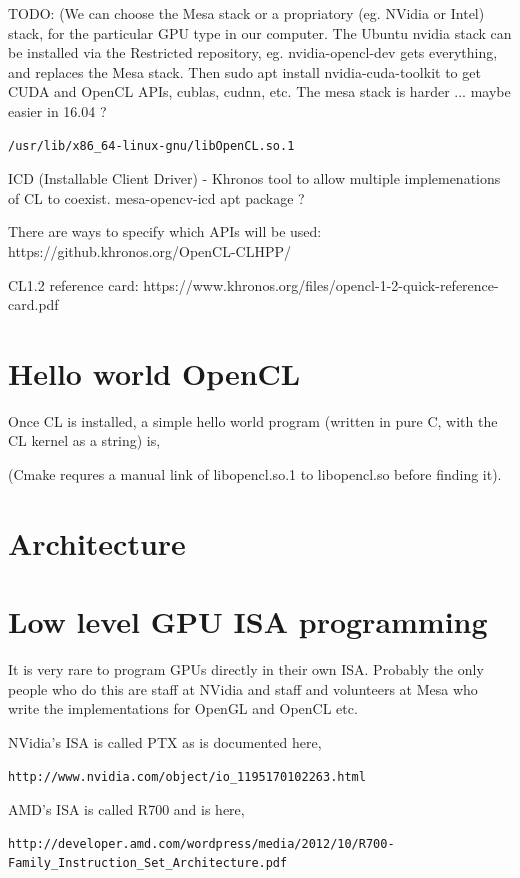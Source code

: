 \documentclass[oneside,english]{scrbook}
\begin{document}
TODO:  (We can choose the Mesa stack or a propriatory (eg. NVidia or Intel) stack, for the particular GPU type in our computer.  The Ubuntu nvidia stack can be installed via the Restricted repository, eg. nvidia-opencl-dev gets everything, and replaces the Mesa stack.  Then sudo apt install nvidia-cuda-toolkit to get CUDA and OpenCL APIs, cublas, cudnn, etc.  The mesa stack is harder ...  maybe easier in 16.04 ?
\begin{lstlisting}
/usr/lib/x86_64-linux-gnu/libOpenCL.so.1
\end{lstlisting}
ICD (Installable Client Driver) - Khronos tool to allow multiple implemenations of CL to coexist.
mesa-opencv-icd  apt package ?

There are ways to specify which APIs will be used: https://github.khronos.org/OpenCL-CLHPP/

CL1.2 reference card: https://www.khronos.org/files/opencl-1-2-quick-reference-card.pdf


\section{Hello world OpenCL}
Once CL is installed, a simple hello world program (written in pure C, with the CL kernel as a string) is,




(Cmake requres a manual link of libopencl.so.1 to libopencl.so before finding it).

\section{Architecture}

\section{Low level GPU ISA programming}

It is very rare to program GPUs directly in their own ISA.  Probably the only people who do this are staff at NVidia and staff and volunteers at Mesa who write the implementations for OpenGL and OpenCL etc.

NVidia's ISA is called PTX as is documented here,
\begin{lstlisting}
http://www.nvidia.com/object/io_1195170102263.html
\end{lstlisting}

AMD's ISA is called R700 and is here,
\begin{lstlisting}
http://developer.amd.com/wordpress/media/2012/10/R700-Family_Instruction_Set_Architecture.pdf
\end{lstlisting}
\end{document}
